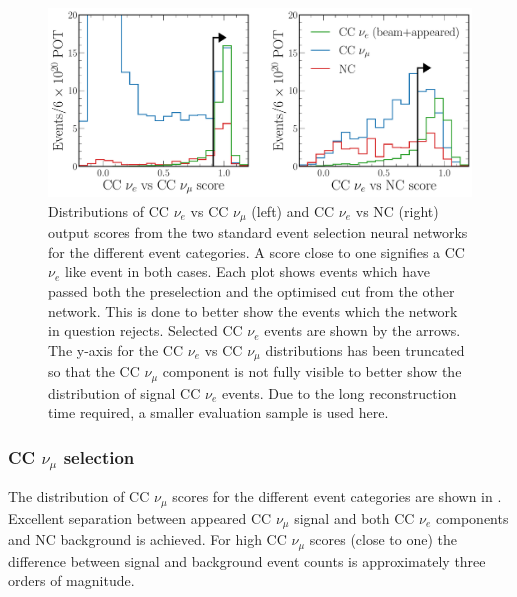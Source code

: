 \begin{figure} %
    \includegraphics[width=\textwidth]{diagrams/7-results/final_old_pid_outputs.pdf}
    \caption[Distributions of standard event selection neural network output scores]
    {Distributions of CC $\nu_{e}$ vs CC $\nu_{\mu}$ (left) and CC $\nu_{e}$ vs NC (right) output
        scores from the two standard event selection neural networks for the different event
        categories. A score close to one signifies a CC $\nu_{e}$ like event in both cases. Each
        plot shows events which have passed both the preselection and the optimised cut from the
        other network. This is done to better show the events which the network in question
        rejects. Selected CC $\nu_{e}$ events are shown by the arrows. The y-axis for the CC
        $\nu_{e}$ vs CC $\nu_{\mu}$ distributions has been truncated so that the CC $\nu_{\mu}$
        component is not fully visible to better show the distribution of signal CC $\nu_{e}$
        events. Due to the long reconstruction time required, a smaller evaluation sample is used
        here.}
    \label{fig:final_old_pid_outputs}
\end{figure}

\subsubsection*{CC $\nu_{\mu}$ selection} %

The distribution of CC $\nu_{\mu}$ scores for the different event categories are shown in
. Excellent separation between appeared CC $\nu_{\mu}$
signal and both CC $\nu_{e}$ components and NC background is achieved. For high CC $\nu_{\mu}$
scores (close to one) the difference between signal and background event counts is approximately
three orders of magnitude.

